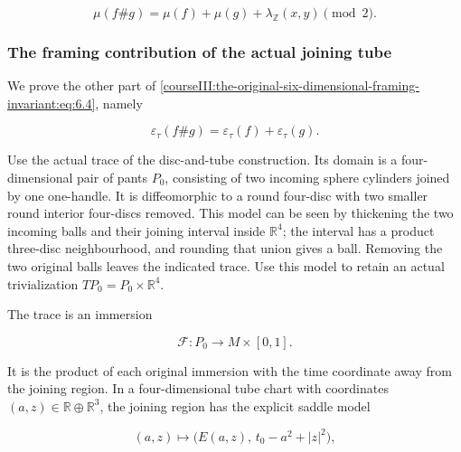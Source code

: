 \begin{equation}
\mu(f\#g)=\mu(f)+\mu(g)+\lambda_{\mathbb Z}(x,y)\pmod2.
 \label{courseIII:the-original-six-dimensional-framing-invariant:eq:6.4}
\end{equation}

\subsubsection{The framing contribution of the actual joining tube}
\label{courseIII:the-original-six-dimensional-framing-invariant:section-6.2}

We prove the other part of \eqref{courseIII:the-original-six-dimensional-framing-invariant:eq:6.4}, namely

\begin{equation}
\varepsilon_\tau(f\#g)
                            =\varepsilon_\tau(f)+\varepsilon_\tau(g).
 \label{courseIII:the-original-six-dimensional-framing-invariant:eq:6.5}
\end{equation}

Use the actual trace of the disc-and-tube construction. Its domain is a four-dimensional pair of pants \(P_0\), consisting of two incoming sphere cylinders joined by one one-handle. It is diffeomorphic to a round four-disc with two smaller round interior four-discs removed. This model can be seen by thickening the two incoming balls and their joining interval inside \(\mathbb R^4\); the interval has a product three-disc neighbourhood, and rounding that union gives a ball. Removing the two original balls leaves the indicated trace. Use this model to retain an actual trivialization \(TP_0=P_0\times\mathbb R^4\).

The trace is an immersion

\begin{equation}
\mathcal F:P_0\longrightarrow M\times[0,1].
 \label{courseIII:the-original-six-dimensional-framing-invariant:eq:6.6}
\end{equation}

It is the product of each original immersion with the time coordinate away from the joining region. In a four-dimensional tube chart with coordinates \((a,z)\in\mathbb R\oplus\mathbb R^3\), the joining region has the explicit saddle model

\begin{equation}
(a,z)\longmapsto
       \bigl(E(a,z),\,t_0-a^2+|z|^2\bigr),
 \label{courseIII:the-original-six-dimensional-framing-invariant:eq:6.7}
\end{equation}

